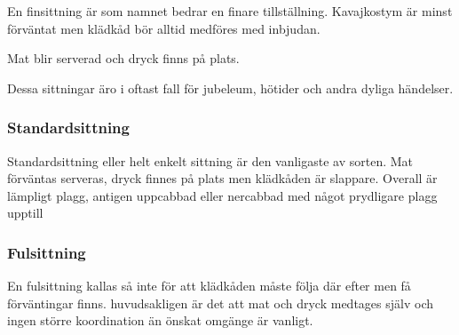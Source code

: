 En finsittning är som namnet bedrar en finare tillställning. Kavajkostym är minst förväntat men klädkåd bör alltid medföres med inbjudan. 

Mat blir serverad och dryck finns på plats. 

Dessa sittningar äro i oftast fall för jubeleum, hötider och andra dyliga händelser.

\subsubsection{Standardsittning}

Standardsittning eller helt enkelt sittning är den vanligaste av sorten. Mat förväntas serveras, dryck finnes på plats men klädkåden är slappare. Overall är lämpligt plagg, antigen uppcabbad eller nercabbad med något prydligare plagg upptill

\subsubsection{Fulsittning}

En fulsittning kallas så inte för att klädkåden måste följa där efter men få förväntingar finns. huvudsakligen är det att mat och dryck medtages själv och ingen större koordination än önskat omgänge är vanligt.



\newpage